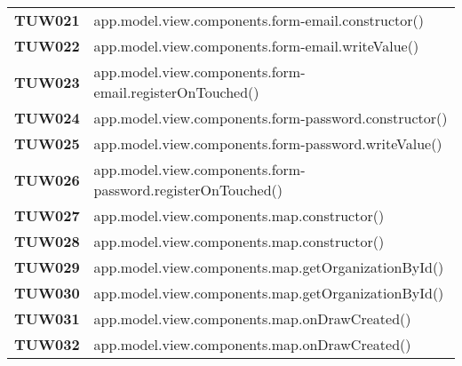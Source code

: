 \documentclass[../../piano-di-qualifica.tex]{subfiles}
\begin{document}
\begin{longtable}[H]{>{\centering\bfseries}m{3cm} >{}m{13cm}}

  TUW021             & app.model.view.components.form-email.constructor\@()                                                    \\

  TUW022             & app.model.view.components.form-email.writeValue\@()                                                     \\

  TUW023             & app.model.view.components.form-email.registerOnTouched\@()                                              \\


  TUW024             & app.model.view.components.form-password.constructor\@()                                                 \\

  TUW025             & app.model.view.components.form-password.writeValue\@()                                                  \\

  TUW026             & app.model.view.components.form-password.registerOnTouched\@()                                           \\


  TUW027             & app.model.view.components.map.constructor\@()                                                           \\

  TUW028             & app.model.view.components.map.constructor\@()                                                           \\

  TUW029             & app.model.view.components.map.getOrganizationById\@()                                                   \\

  TUW030             & app.model.view.components.map.getOrganizationById\@()                                                   \\

  TUW031             & app.model.view.components.map.onDrawCreated\@()                                                         \\

  TUW032             & app.model.view.components.map.onDrawCreated\@()                                                         \\



\end{longtable}
\end{document}
